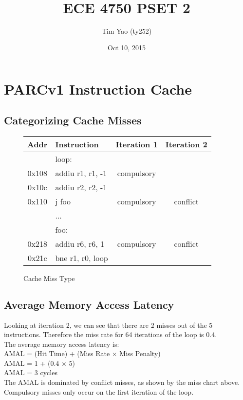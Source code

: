 \documentclass[10pt]{article}
\title{ECE 4750 PSET 2}
\author{Tim Yao (ty252)}
\date{Oct 10, 2015}
\begin{document}
\maketitle
\newcommand*{\tableindent}{\hspace*{0.3cm}}%

\section{PARCv1 Instruction Cache} 
\subsection{Categorizing Cache Misses}
\begin{figure}[H]
\centering
\begin{tabular}{clcc}
\hline
\textbf{Addr} &\textbf{Instruction}& \textbf{Iteration 1} & \textbf{Iteration 2}\\
\hline
& loop: & & \\
\hline
0x108 & \tableindent addiu r1, r1, -1 & compulsory & \\
\hline
0x10c & \tableindent addiu r2, r2, -1 & 		   & \\
\hline
0x110 & \tableindent j foo			  & compulsory & conflict \\
\hline
	  & ...							  & 		   & \\
\hline
	  & foo:						  & 		   & \\
\hline
0x218 & \tableindent addiu r6, r6, 1  & compulsory & conflict \\
\hline
0x21c & \tableindent bne r1, r0, loop & 	       & \\
\hline
\end{tabular}
\caption{Cache Miss Type}
\end{figure}

\subsection{Average Memory Access Latency}
Looking at iteration 2, we can see that there are 2 misses out of the 5 instructions. Therefore the miss rate for 64 iterations of the loop is 0.4.\\
The average memory access latency is: \\
AMAL = (Hit Time) + (Miss Rate $\times$ Miss Penalty)\\
AMAL = 1 + (0.4 $\times$ 5)\\
AMAL = 3 cycles\\
The AMAL is dominated by conflict misses, as shown by the miss chart above. Compulsory misses only occur on the first iteration of the loop.
\end{document}
